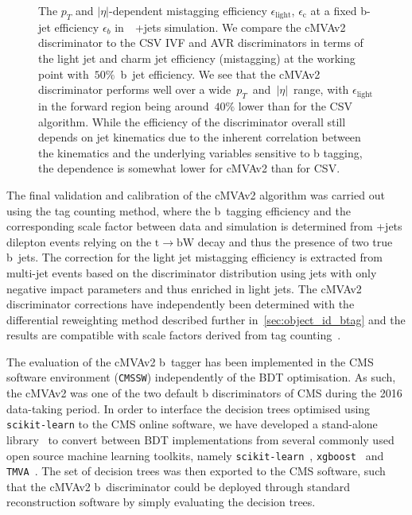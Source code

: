 \begin{figure}
\begin{centering}
\caption[The cMVAv2 mistagging probability as a function of jet kinematics.]{The $p_T$ and $|\eta|$-dependent mistagging efficiency $\epsilon_{\mathrm{light}}$, $\epsilon_{\mathrm{c}}$ at a fixed b-jet efficiency $\epsilon_{b}$ in~\ttbar~+jets simulation. We compare the cMVAv2 discriminator to the CSV IVF and AVR discriminators in terms of the light jet and charm jet efficiency (mistagging) at the working point with~$50\%$~b~jet efficiency. We see that the cMVAv2 discriminator performs well over a wide~$p_T$~and~$|\eta|$~range, with $\epsilon_{\mathrm{light}}$ in the forward region being around~$40\%$ lower than for the CSV algorithm. While the efficiency of the discriminator overall still depends on jet kinematics due to the inherent correlation between the kinematics and the underlying variables sensitive to b tagging, the dependence is somewhat lower for cMVAv2 than for CSV.}
\label{fig:btag_kinematics}
\end{centering}
\end{figure}

The final validation and calibration of the cMVAv2 algorithm was carried out using the tag counting method, where the b~tagging efficiency and the corresponding scale factor between data and simulation is determined from \ttbar+jets dilepton events relying on the $\mathrm{t} \rightarrow \mathrm{b} \mathrm{W}$ decay and thus the presence of two true b~jets. The correction for the light jet mistagging efficiency is extracted from multi-jet events based on the discriminator distribution using jets with only negative impact parameters and thus enriched in light jets. The cMVAv2 discriminator corrections have independently been determined with the differential reweighting method described further in~\cref{sec:object_id_btag} and the results are compatible with scale factors derived from tag counting~\cite{CMS-PAS-BTV-15-001}. 

The evaluation of the cMVAv2 b~tagger has been implemented in the CMS software environment (\texttt{CMSSW}) independently of the BDT optimisation. As such, the cMVAv2 was one of the two default b discriminators of CMS during the 2016 data-taking period. In order to interface the decision trees optimised using \texttt{scikit-learn} to the CMS online software, we have developed a stand-alone library~\cite{mlglue} to convert between BDT implementations from several commonly used open source machine learning toolkits, namely \texttt{scikit-learn}~\cite{scikit-learn}, \texttt{xgboost}~\cite{xgboost} and \texttt{TMVA}~\cite{Hocker:2007ht}. The set of decision trees was then exported to the CMS software, such that the cMVAv2 b~discriminator could be deployed through standard reconstruction software by simply evaluating the decision trees.

